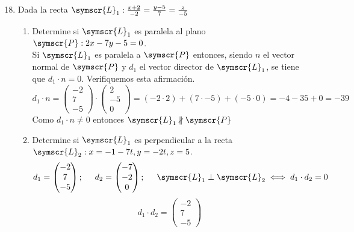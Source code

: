 \documentclass{article}
\def\fancyL{\symscr{L}}
\def\fancyP{\symscr{P}}
\begin{document}
\begin{enumerate}
\setcounter{enumi}{17}
\item Dada la recta \(\fancyL_1: \frac{x + 2}{-2} = \frac{y - 5}{7} = \frac{z}{-5}\)
    \begin{enumerate}[label=\listAlph]
        \item Determine si \(\fancyL_1\) es paralela al plano \(\fancyP: 2x - 7y - 5 = 0\). \\
            Si \(\fancyL_1\) es paralela a \(\fancyP\) entonces, siendo \(n\) el vector normal de \(\fancyP\) y 
            \(d_1\) el vector director de \(\fancyL_1\), se tiene que \(d_1 \cdot n = 0\). Verifiquemos esta afirmación.
            \[
                d_1 \cdot n  = 
                \begin{pmatrix}
                    -2 \\ 7 \\ -5
                \end{pmatrix}
                \cdot 
                \begin{pmatrix}
                    2 \\ -5 \\ 0
                \end{pmatrix}
                =
                (-2 \cdot 2) + (7 \cdot -5) + (-5 \cdot 0)
                =
                -4 - 35 + 0
                =
                -39
            \]
            Como \(d_1 \cdot n \neq 0\) entonces \(\fancyL_1 \nparallel \fancyP\)
        \item Determine si \(\fancyL_1\) es perpendicular a la recta \(\fancyL_2: x = -1 -7t, y = -2t, z = 5\).
            \[
                d_1 = \begin{pmatrix}
                    -2 \\ 7 \\ -5
                \end{pmatrix};
                \hspace{0.5cm}
                d_2 = \begin{pmatrix}
                    -7 \\ -2 \\ 0
                \end{pmatrix};
                \hspace{0.5cm}
                \fancyL_1 \perp \fancyL_2 \iff d_1 \cdot d_2 = 0
            \]
            \[
                d_1 \cdot d_2 
                = 
                \begin{pmatrix}
                    -2 \\ 7 \\ -5

\end{pmatrix}\]
\end{enumerate}
\end{enumerate}
\end{document}
